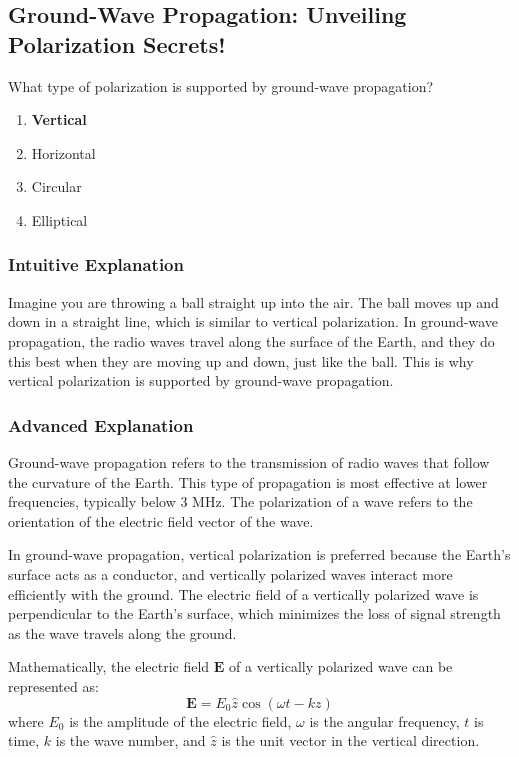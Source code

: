 \subsection{Ground-Wave Propagation: Unveiling Polarization Secrets!}

\begin{tcolorbox}[colback=gray!10!white,colframe=black!75!black,title=E3B13] What type of polarization is supported by ground-wave propagation?
    \begin{enumerate}[label=\Alph*.]
        \item \textbf{Vertical}
        \item Horizontal
        \item Circular
        \item Elliptical
    \end{enumerate}
\end{tcolorbox}

\subsubsection{Intuitive Explanation}
Imagine you are throwing a ball straight up into the air. The ball moves up and down in a straight line, which is similar to vertical polarization. In ground-wave propagation, the radio waves travel along the surface of the Earth, and they do this best when they are moving up and down, just like the ball. This is why vertical polarization is supported by ground-wave propagation.

\subsubsection{Advanced Explanation}
Ground-wave propagation refers to the transmission of radio waves that follow the curvature of the Earth. This type of propagation is most effective at lower frequencies, typically below 3 MHz. The polarization of a wave refers to the orientation of the electric field vector of the wave.

In ground-wave propagation, vertical polarization is preferred because the Earth's surface acts as a conductor, and vertically polarized waves interact more efficiently with the ground. The electric field of a vertically polarized wave is perpendicular to the Earth's surface, which minimizes the loss of signal strength as the wave travels along the ground.

Mathematically, the electric field \( \mathbf{E} \) of a vertically polarized wave can be represented as:
\[
\mathbf{E} = E_0 \hat{z} \cos(\omega t - kz)
\]
where \( E_0 \) is the amplitude of the electric field, \( \omega \) is the angular frequency, \( t \) is time, \( k \) is the wave number, and \( \hat{z} \) is the unit vector in the vertical direction.

